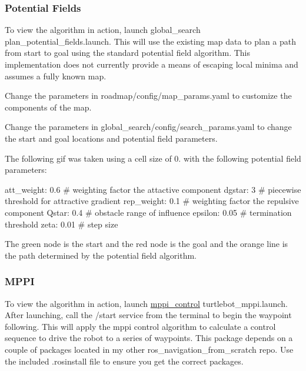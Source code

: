 \subsubsection*{Potential Fields}

To view the algorithm in action, launch {\ttfamily global\+\_\+search plan\+\_\+potential\+\_\+fields.\+launch}. This will use the existing map data to plan a path from start to goal using the standard potential field algorithm. This implementation does not currently provide a means of escaping local minima and assumes a fully known map.


\begin{DoxyItemize}
\item Change the parameters in {\ttfamily roadmap/config/map\+\_\+params.\+yaml} to customize the components of the map.
\item Change the parameters in {\ttfamily global\+\_\+search/config/search\+\_\+params.\+yaml} to change the start and goal locations and potential field parameters.
\end{DoxyItemize}

The following gif was taken using a cell size of 0. with the following potential field parameters\+: 
\begin{DoxyCode}
att\_weight: 0.6 # weighting factor the attactive component
dgstar: 3 # piecewise threshold for attractive gradient
rep\_weight: 0.1 # weighting factor the repulsive component
Qstar: 0.4 # obstacle range of influence
epsilon: 0.05 # termination threshold
zeta: 0.01 # step size
\end{DoxyCode}
 The green node is the start and the red node is the goal and the orange line is the path determined by the potential field algorithm.



\subsubsection*{M\+P\+PI}

To view the algorithm in action, launch {\ttfamily \hyperlink{namespacemppi__control}{mppi\+\_\+control} turtlebot\+\_\+mppi.\+launch}. After launching, call the {\ttfamily /start} service from the terminal to begin the waypoint following. This will apply the mppi control algorithm to calculate a control sequence to drive the robot to a series of waypoints. This package depends on a couple of packages located in my other {\ttfamily ros\+\_\+navigation\+\_\+from\+\_\+scratch} repo. Use the included .rosinstall file to ensure you get the correct packages.


